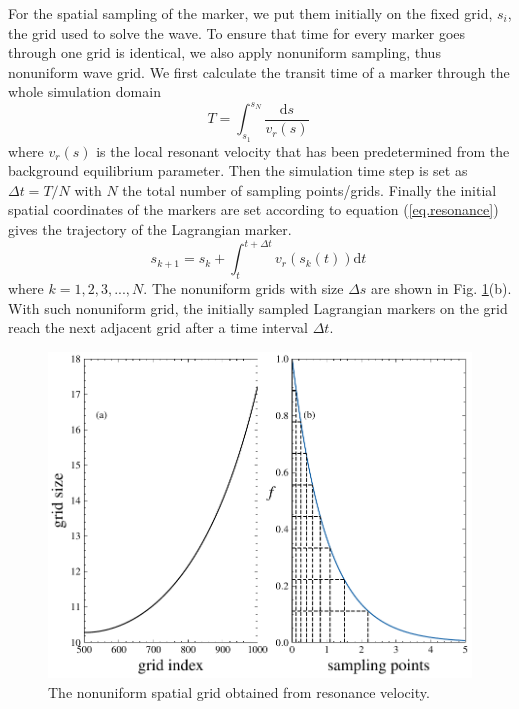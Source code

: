 For the spatial sampling of the marker, we put them initially on the fixed grid, $s_i$, the grid used to solve the wave.
To ensure that time for every marker goes through one grid is identical, we also apply nonuniform sampling, thus nonuniform wave grid.
We first calculate the transit time of a marker through the whole simulation domain
\begin{equation}
    T = \int_{s_1}^{s_N} \frac{\mathrm{d}s}{v_r(s)}~
\end{equation}
where $v_r(s)$ is the local resonant velocity that has been predetermined from the background equilibrium parameter.
Then the simulation time step is set as $\Delta t = T/N$ with $N$ the total number of sampling points/grids.
Finally the initial spatial coordinates of the markers are set according to equation (\ref{eq.resonance}) gives the trajectory of the Lagrangian marker. 
\begin{equation}
    s_{k+1} = s_k +  \int_{t}^{t+\Delta t} v_r(s_k(t)) \mathrm{d}t~
\end{equation}
where $k=1,2,3,...,N$.
The nonuniform grids with size $\Delta s$ are shown in Fig. \ref{fig.uni_grid}(b). 
With such nonuniform grid, the initially sampled Lagrangian markers on the grid reach the next adjacent grid after a time interval $\Delta t$.
\begin{figure}[htbp]
    \centering
    \includegraphics[scale=0.5]{cpc_img/fig_nu_grid.pdf}
    \caption{The nonuniform spatial grid obtained from resonance velocity. 
    }
    \label{fig.uni_grid}
\end{figure}
